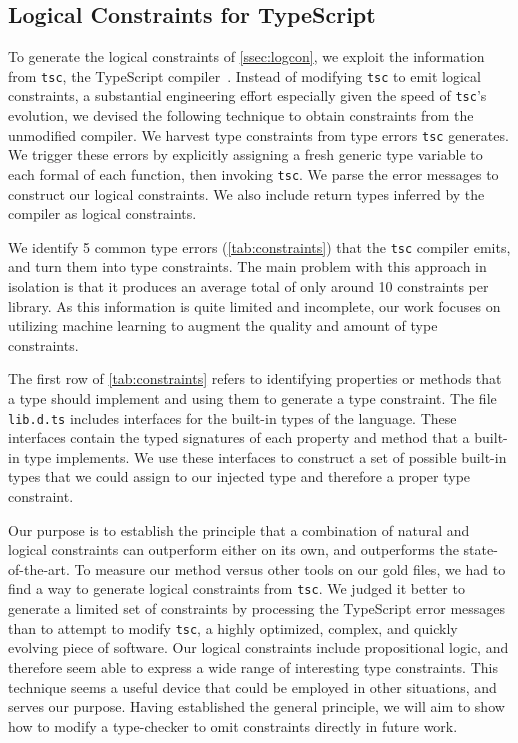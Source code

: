 \documentclass[sigplan,10pt,review,anonymous]{acmart} %
\newcommand{\margincomment}[2]{\marginpar{\scriptsize\color{Maroon}#1 says: #2}}
\newcommand{\adg}[1]{\margincomment{ADG}{#1}}
\theoremstyle{plain}
\theoremstyle{remark}
\theoremstyle{definition}
\begin{document}
\subsection{Logical Constraints for TypeScript}
\label{ssec:logprodts}

To generate the logical constraints of \cref{ssec:logcon}, we exploit the information from \lstinline+tsc+, the TypeScript compiler~\cite{typescript}.
%
Instead of modifying \lstinline+tsc+ to emit logical constraints, a substantial
engineering effort especially given the speed of \lstinline+tsc+'s evolution,
we devised the following technique to obtain constraints from the unmodified compiler.
%
We harvest type constraints from type errors \lstinline+tsc+ generates.  We trigger
these errors by explicitly assigning a fresh generic type variable to
each formal of each function, then invoking \lstinline+tsc+.
%
We parse the error messages to construct our logical constraints.
%
We also include return types inferred by the compiler as logical constraints.
%

We identify 5 common type errors (\cref{tab:constraints}) that the \texttt{tsc}
compiler emits, and turn them into type constraints. The main problem with
this approach in isolation is that it produces an average total
of only around 10 constraints per library. As this information is quite
limited and incomplete, our work focuses on utilizing machine learning to augment
the quality and amount of type constraints.

The first row of \cref{tab:constraints}
refers to identifying properties or methods that a type should implement
and using them to generate a type constraint.
The file \lstinline{lib.d.ts} includes interfaces for the built-in types of the language.
These interfaces contain the typed signatures of each property and method
that a built-in type implements. We use these interfaces to construct a set of
possible built-in types that we could assign to our injected type and therefore a proper
type constraint.

Our purpose is to establish the principle that a combination of natural and logical constraints can outperform either on its own, and outperforms the state-of-the-art.
%
To measure our method versus other tools on our gold files, we had to find a way to generate logical constraints from \lstinline+tsc+.
%
We judged it better to generate a limited set of constraints by processing the
TypeScript error messages than to attempt to modify \lstinline+tsc+, a highly optimized, complex, and quickly evolving piece of software.
%
Our logical constraints include propositional logic, and therefore seem able to express a wide range of interesting type constraints.
%
This technique seems a useful device that could be employed in other situations, and serves our purpose.
%
Having established the general principle, we will aim to show how to modify a type-checker to omit constraints directly in future work.
\end{document}
